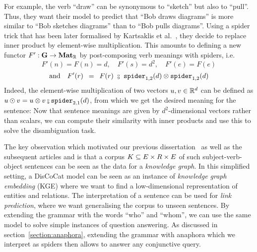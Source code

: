 For example, the verb ``draw'' can be synonymous to ``sketch'' but also to ``pull''.
Thus, they want their model to predict that ``Bob draws diagrams'' is more similar to ``Bob sketches diagrams'' than to ``Bob pulls diagrams''.
Using a spider trick that has been later formalised by Kartsaklis et al.~\cite{KartsaklisEtAl12}, they decide to replace inner product by element-wise multiplication.
This amounts to defining a new functor $F' : \mathbf{G} \to \mathbf{Mat}_{\mathbb{R}}$ by post-composing verb meanings with spiders, i.e.
$$
F'(n) = F(n) = d, \quad F'(s) = d^2, \quad F'(e) = F(e)
$$ $$
\text{and} \quad F'(r) \s = \s F(r) \ \fcmp \ \spider_{1, 2}(d) \otimes \spider_{1, 2}(d)
$$
Indeed, the element-wise multiplication of two vectors $u, v \in \mathbb{R}^d$ can be defined as $u \odot v = u \otimes v \fcmp \spider_{2, 1}(d)$, from which we get the desired meaning for the sentence:
Now that sentence meanings are given by $d^2$-dimensional vectors rather than scalars, we can compute their similarity with inner products and use this to solve the disambiguation task.

The key observation which motivated our previous dissertation~\cite{Toumi18a} as well as the subsequent articles \cite{CoeckeEtAl18a} and \cite{FeliceEtAl19} is that a corpus $K \subseteq E \times R \times E$ of such subject-verb-object sentences can be seen as the data for a \emph{knowledge graph}.
In this simplified setting, a DisCoCat model can be seen as an instance of \emph{knowledge graph embedding} (KGE) where we want to find a low-dimensional representation of entities and relations.
The interpretation of a sentence can be used for \emph{link prediction}, where we want generalising the corpus to unseen sentences.
By extending the grammar with the words ``who'' and ``whom'', we can use the same model to solve simple instances of question answering.
As discussed in section~\ref{section:anaphora}, extending the grammar with anaphora which we interpret as spiders then allows to answer any conjunctive query.

